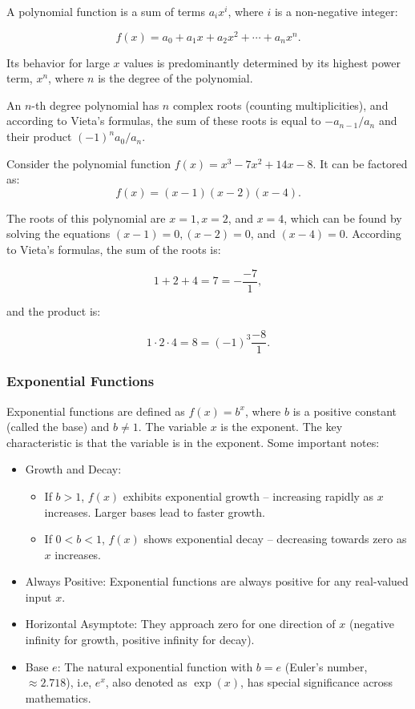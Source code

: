 \documentclass[12pt]{article}
\begin{document}
A polynomial function is a sum of terms $a_i x^i$, where $i$ is a non-negative integer:

\[
f(x) = a_0 + a_1 x + a_2 x^2 + \cdots + a_n x^n.
\]

Its behavior for large $x$ values is predominantly determined by its highest power term, $x^n$, where $n$ is the degree of the polynomial.

An $n$-th degree polynomial has $n$ complex roots (counting multiplicities), and according to Vieta's formulas, the sum of these roots is equal to $-a_{n-1}/a_n$ and their product $(-1)^n a_0/a_n$.

\begin{example}
Consider the polynomial function $f(x) = x^3 - 7x^2 + 14x - 8$. It can be factored as:
\[
f(x) = (x - 1)(x - 2)(x - 4).
\]
\end{example}

The roots of this polynomial are $x = 1, x = 2$, and $x = 4$, which can be found by solving the equations $(x - 1) = 0, (x - 2) = 0$, and $(x - 4) = 0$. According to Vieta's formulas, the sum of the roots is:

\[
1 + 2 + 4 = 7 = -\frac{-7}{1},
\]

and the product is:

\[
1 \cdot 2 \cdot 4 = 8 = (-1)^3 \frac{-8}{1}.
\]

\subsubsection*{Exponential Functions}

Exponential functions are defined as $f(x) = b^x$, where $b$ is a positive constant (called the base) and $b \neq 1$. The variable $x$ is the exponent. The key characteristic is that the variable is in the exponent. Some important notes:

\begin{itemize}
    \item Growth and Decay:
    \begin{itemize}
        \item If $b > 1$, $f(x)$ exhibits exponential growth -- increasing rapidly as $x$ increases. Larger bases lead to faster growth.
        
        \item If $0 < b < 1$, $f(x)$ shows exponential decay -- decreasing towards zero as $x$ increases.
    \end{itemize}
    
    \item Always Positive: Exponential functions are always positive for any real-valued input $x$.
    
    \item Horizontal Asymptote: They approach zero for one direction of $x$ (negative infinity for growth, positive infinity for decay).
    
    \item Base $e$: The natural exponential function with $b = e$ (Euler's number, $\approx 2.718$), i.e, $e^x$, also denoted as $\exp(x)$, has special significance across mathematics.
\end{itemize}
\end{document}
